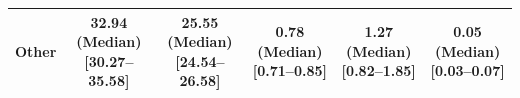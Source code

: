 \begin{table}[!h]
\begin{tabular}[t]{lccccc}
Other & \makecell{32.94 (Median) \\ {[30.27--35.58]}} & \makecell{25.55 (Median) \\ {[24.54--26.58]}} & \makecell{0.78 (Median) \\ {[0.71--0.85]}} & \makecell{1.27 (Median) \\ {[0.82--1.85]}} & \makecell{0.05 (Median) \\ {[0.03--0.07]}}\\
\bottomrule
\end{tabular}
\end{table}
